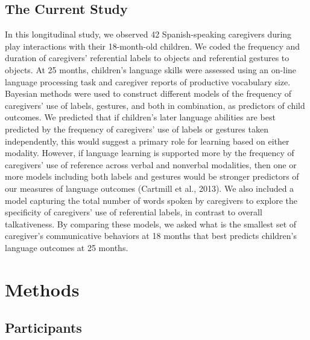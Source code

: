 \documentclass[
  english,
  man,mask]{apa6}
\begin{document}
\hypertarget{the-current-study}{%
\subsection{The Current Study}\label{the-current-study}}

In this longitudinal study, we observed 42 Spanish-speaking caregivers during play interactions with their 18-month-old children. We coded the frequency and duration of caregivers' referential labels to objects and referential gestures to objects. At 25 months, children's language skills were assessed using an on-line language processing task and caregiver reports of productive vocabulary size. Bayesian methods were used to construct different models of the frequency of caregivers' use of labels, gestures, and both in combination, as predictors of child outcomes.
We predicted that if children's later language abilities are best predicted by the frequency of caregivers' use of labels or gestures taken independently, this would suggest a primary role for learning based on either modality. However, if language learning is supported more by the frequency of caregivers' use of reference across verbal and nonverbal modalities, then one or more models including both labels and gestures would be stronger predictors of our measures of language outcomes (Cartmill et al., 2013). We also included a model capturing the total number of words spoken by caregivers to explore the specificity of caregivers' use of referential labels, in contrast to overall talkativeness. By comparing these models, we asked what is the smallest set of caregiver's communicative behaviors at 18 months that best predicts children's language outcomes at 25 months.

\hypertarget{methods}{%
\section{Methods}\label{methods}}

\hypertarget{participants}{%
\subsection{Participants}\label{participants}}
\end{document}
